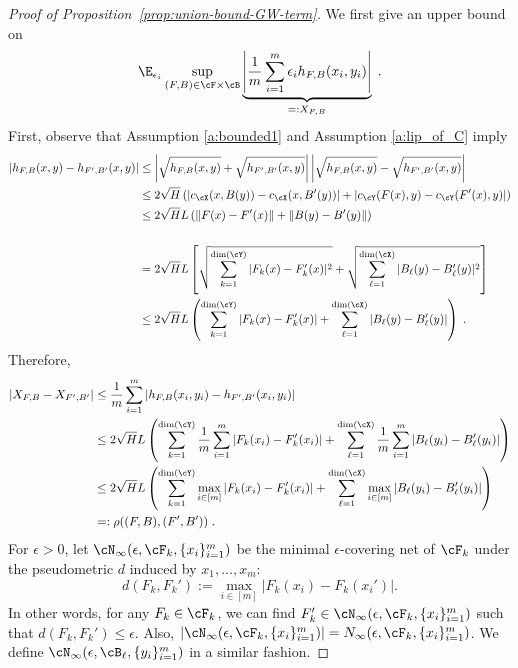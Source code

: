 \documentclass[11pt]{article}
\begin{document}
\begin{proof}[Proof of Proposition~\ref{prop:union-bound-GW-term}]
	We first give an upper bound on 
	\begin{equation*}
		\E_{\epsilon_i} \sup_{(F, B) \in \cF \times \cB} \underbrace{\left|\frac{1}{m} \sum_{i=1}^{m} \epsilon_i h_{F, B}(x_i, y_i) \right|}_{=: X_{F, B}} \;.
	\end{equation*}
	First, observe that Assumption \ref{a:bounded1} and Assumption \ref{a:lip_of_C} imply 
	\begin{equation*}
		\begin{split}
			|h_{F, B}(x, y) - h_{F', B'}(x, y)|
			& \le
			\left| \sqrt{h_{F, B}(x, y)} + \sqrt{h_{F', B'}(x, y)} \right| \left| \sqrt{h_{F, B}(x, y)} - \sqrt{h_{F', B'}(x, y)} \right| \\
			& \le 
			2 \sqrt{H} \left( |c_{\cX}(x, B(y)) - c_{\cX}(x, B'(y))| + |c_{\cY}(F(x), y) - c_{\cY}(F'(x), y)| \right) \\
			& \le
			2 \sqrt{H} L \left( \|F(x) - F'(x)\| + \|B(y) - B'(y)\| \right) \\
			\\
			& =
			2 \sqrt{H} L \left[ \sqrt{\sum_{k = 1}^{\mathrm{dim}(\cY)} |F_k(x) - F_k'(x)|^2} + \sqrt{\sum_{\ell = 1}^{\mathrm{dim}(\cX)} |B_\ell(y) - B_\ell'(y)|^2} \right]\\
			& \le 
			2 \sqrt{H} L \left(\sum_{k = 1}^{\mathrm{dim}(\cY)} |F_k(x) - F_k'(x)| + \sum_{\ell = 1}^{\mathrm{dim}(\cX)} |B_\ell(y) - B_\ell'(y)|\right) \;. 
		\end{split}
	\end{equation*}
	Therefore, 
	\begin{equation*}
		\begin{split}
			|X_{F, B} - X_{F', B'}| 
			& \le \frac{1}{m} \sum_{i = 1}^{m} |h_{F, B}(x_i, y_i) - h_{F', B'}(x_i, y_i)| \\
			& \le 
			2 \sqrt{H} L \left(\sum_{k = 1}^{\mathrm{dim}(\cY)} \frac{1}{m} \sum_{i = 1}^{m} |F_k(x_i) - F_k'(x_i)| + \sum_{\ell = 1}^{\mathrm{dim}(\cX)} \frac{1}{m} \sum_{i = 1}^{m} |B_\ell(y_i) - B_\ell'(y_i)|\right) \\
			& \le
			2 \sqrt{H} L \left(\sum_{k = 1}^{\mathrm{dim}(\cY)} \max_{i \in [m]} |F_k(x_i) - F_k'(x_i)| + \sum_{\ell = 1}^{\mathrm{dim}(\cX)} \max_{i \in [m]} |B_\ell(y_i) - B_\ell'(y_i)|\right) \\
			& =: \rho((F, B), (F', B')) \;.
		\end{split}
	\end{equation*}
	For $\epsilon > 0$, let $\cN_\infty(\epsilon, \cF_k, \{x_i\}_{i=1}^{m})$ be the minimal $\epsilon$-covering net of $\cF_k$ under the pseudometric $d$ induced by $x_1, \ldots, x_m$:
	\begin{equation*}
		d(F_k, F_k') := \max_{i \in [m]} | F_k(x_i) - F_k(x_i') |.
	\end{equation*}
	In other words, for any $F_k \in \cF_k$, we can find $F_k' \in \cN_\infty(\epsilon, \cF_k, \{x_i\}_{i=1}^{m})$ such that $d(F_k, F_k') \le \epsilon$. Also, $|\cN_\infty(\epsilon, \cF_k, \{x_i\}_{i=1}^{m})| = N_\infty(\epsilon, \cF_k, \{x_i\}_{i=1}^{m})$. We define $\cN_\infty(\epsilon, \cB_\ell, \{y_i\}_{i=1}^{m})$ in a similar fashion.
	

\end{proof}
\end{document}
